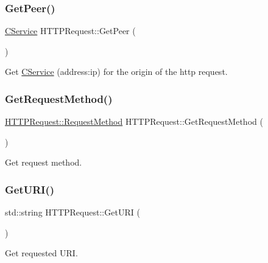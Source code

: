 \subsubsection{\texorpdfstring{Get\+Peer()}{GetPeer()}}
{\footnotesize\ttfamily \mbox{\hyperlink{class_c_service}{C\+Service}} H\+T\+T\+P\+Request\+::\+Get\+Peer (\begin{DoxyParamCaption}{ }\end{DoxyParamCaption})}

Get \mbox{\hyperlink{class_c_service}{C\+Service}} (address\+:ip) for the origin of the http request. \mbox{\label{class_h_t_t_p_request_afc79079a153c70240914617a9dde075d}} 
\subsubsection{\texorpdfstring{Get\+Request\+Method()}{GetRequestMethod()}}
{\footnotesize\ttfamily \mbox{\hyperlink{class_h_t_t_p_request_a1afe92e9caad997b8f88f0cb07dcc5aa}{H\+T\+T\+P\+Request\+::\+Request\+Method}} H\+T\+T\+P\+Request\+::\+Get\+Request\+Method (\begin{DoxyParamCaption}{ }\end{DoxyParamCaption})}

Get request method. \mbox{\label{class_h_t_t_p_request_a53a138e588e5326d6c87bb84029f43e9}} 
\subsubsection{\texorpdfstring{Get\+U\+R\+I()}{GetURI()}}
{\footnotesize\ttfamily std\+::string H\+T\+T\+P\+Request\+::\+Get\+U\+RI (\begin{DoxyParamCaption}{ }\end{DoxyParamCaption})}

Get requested U\+RI. \mbox{\label{class_h_t_t_p_request_ad0dc256f16fe6d13022958d64b7a22a0}} 
